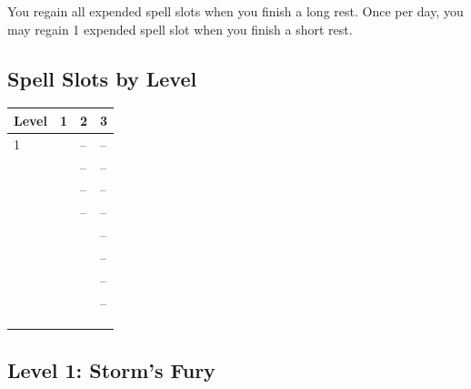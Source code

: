 \documentclass[12pt,letterpaper,twocolumn,openany,nodeprecatedcode,bg=none]{dndbook}
\let\oldsubsection\subsection
\renewcommand{\subsection}[1]{%
  \needspace{5\baselineskip}%
  \oldsubsection{#1}%
}
\begin{document}
You regain all expended spell slots when you finish a long rest. Once
per day, you may regain 1 expended spell slot when you finish a short
rest.

\subsection{Spell Slots by Level}\label{spell-slots-by-level}


{\def\LTcaptype{none} %
\begin{table}[!htbp]
\centering
\begin{tabular}{@{}
  >{\raggedright\arraybackslash}p{}
  >{\raggedright\arraybackslash}p{}
  >{\raggedright\arraybackslash}p{}
  >{\raggedright\arraybackslash}p{}@{}}
\toprule\noalign{}
\begin{minipage}[b]{\linewidth}\raggedright
Level
\end{minipage} & \begin{minipage}[b]{\linewidth}\raggedright
1
\end{minipage} & \begin{minipage}[b]{\linewidth}\raggedright
2
\end{minipage} & \begin{minipage}[b]{\linewidth}\raggedright
3
\end{minipage} \\
\midrule\noalign{}
1 & 2 & -- & -- \\
2 & 2 & -- & -- \\
3 & 3 & -- & -- \\
4 & 3 & -- & -- \\
5 & 4 & 2 & -- \\
6 & 4 & 2 & -- \\
7 & 4 & 3 & -- \\
8 & 4 & 3 & -- \\
9 & 4 & 3 & 2 \\
10 & 4 & 3 & 2 \\
\bottomrule\noalign{}
\end{tabular}
\end{table}
}

\subsection{Level 1: Storm's Fury}\label{level-1-storms-fury}
\end{document}

